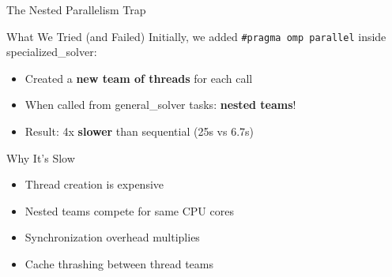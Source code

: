 \documentclass{beamer}
\begin{document}
\begin{frame}{The Nested Parallelism Trap}
\begin{alertblock}{What We Tried (and Failed)}
Initially, we added \texttt{\#pragma omp parallel} inside specialized\_solver:
\begin{itemize}
    \item Created a \textbf{new team of threads} for each call
    \item When called from general\_solver tasks: \textbf{nested teams}!
    \item Result: 4x \textbf{slower} than sequential (25s vs 6.7s)
\end{itemize}
\end{alertblock}

\vspace{0.5em}
\begin{block}{Why It's Slow}
\begin{itemize}
    \item Thread creation is expensive
    \item Nested teams compete for same CPU cores
    \item Synchronization overhead multiplies
    \item Cache thrashing between thread teams
\end{itemize}
\end{block}
\end{frame}
\end{document}
